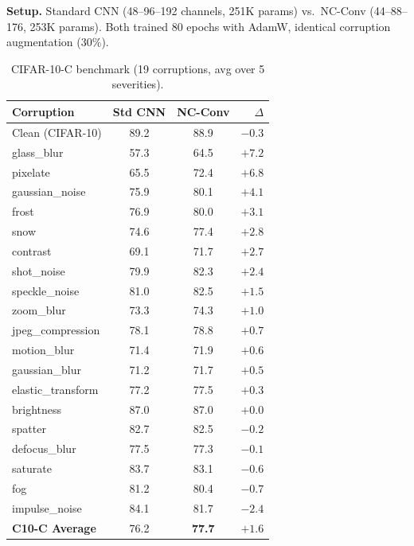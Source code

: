 \documentclass[runningheads]{llncs}
\begin{document}
\noindent\textbf{Setup.}
Standard CNN (48--96--192 channels, 251K params) vs.\ NC-Conv (44--88--176, 253K params).
Both trained 80 epochs with AdamW, identical corruption augmentation (30\%).

\begin{table}[t]
\centering
\caption{CIFAR-10-C benchmark (19 corruptions, avg over 5 severities).}
\label{tab:cifar10c}
\small
\setlength{\tabcolsep}{3pt}
\begin{tabular}{@{}lcc r@{}}
\toprule
\textbf{Corruption} & \textbf{Std CNN} & \textbf{NC-Conv} & $\Delta$ \\
\midrule
Clean (CIFAR-10)    & 89.2 & 88.9 & $-0.3$ \\
\midrule
glass\_blur         & 57.3 & 64.5 & $\mathbf{+7.2}$ \\
pixelate            & 65.5 & 72.4 & $\mathbf{+6.8}$ \\
gaussian\_noise     & 75.9 & 80.1 & $+4.1$ \\
frost               & 76.9 & 80.0 & $+3.1$ \\
snow                & 74.6 & 77.4 & $+2.8$ \\
contrast            & 69.1 & 71.7 & $+2.7$ \\
shot\_noise         & 79.9 & 82.3 & $+2.4$ \\
speckle\_noise      & 81.0 & 82.5 & $+1.5$ \\
zoom\_blur          & 73.3 & 74.3 & $+1.0$ \\
jpeg\_compression   & 78.1 & 78.8 & $+0.7$ \\
motion\_blur        & 71.4 & 71.9 & $+0.6$ \\
gaussian\_blur      & 71.2 & 71.7 & $+0.5$ \\
elastic\_transform  & 77.2 & 77.5 & $+0.3$ \\
brightness          & 87.0 & 87.0 & $+0.0$ \\
spatter             & 82.7 & 82.5 & $-0.2$ \\
defocus\_blur       & 77.5 & 77.3 & $-0.1$ \\
saturate            & 83.7 & 83.1 & $-0.6$ \\
fog                 & 81.2 & 80.4 & $-0.7$ \\
impulse\_noise      & 84.1 & 81.7 & $-2.4$ \\
\midrule
\textbf{C10-C Average} & 76.2 & \textbf{77.7} & $\mathbf{+1.6}$ \\
\bottomrule
\end{tabular}
\end{table}
\end{document}
